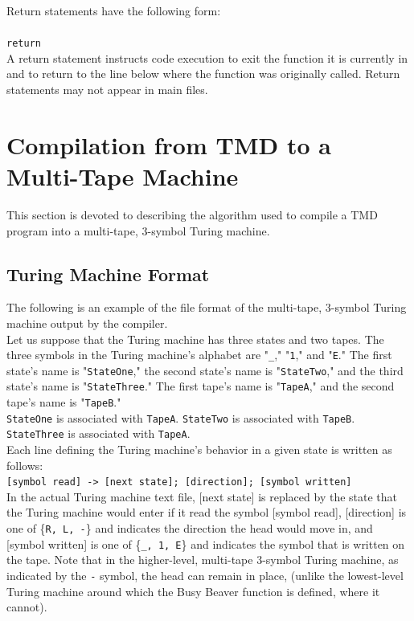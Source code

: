 \documentclass[11pt]{report}
\begin{document}
Return statements have the following form: \\ \\
\texttt{return} \\

A return statement instructs code execution to exit the function it is currently in and to return to the line below where the function was originally called. Return statements may not appear in main files.

\section{Compilation from TMD to a Multi-Tape Machine} \label{sec:turdtotm}

This section is devoted to describing the algorithm used to compile a TMD program into a multi-tape, 3-symbol Turing machine.

\subsection{Turing Machine Format}

The following is an example of the file format of the multi-tape, 3-symbol Turing machine output by the compiler. \\

Let us suppose that the Turing machine has three states and two tapes. The three symbols in the Turing machine's alphabet are "\texttt{\_}," "\texttt{1}," and "\texttt{E}." The first state's name is "\texttt{StateOne}," the second state's name is "\texttt{StateTwo}," and the third state's name is "\texttt{StateThree}." The first tape's name is "\texttt{TapeA}," and the second tape's name is "\texttt{TapeB}." \\

\texttt{StateOne} is associated with \texttt{TapeA}. \texttt{StateTwo} is associated with \texttt{TapeB}. \texttt{StateThree} is associated with \texttt{TapeA}. \\

Each line defining the Turing machine's behavior in a given state is written as follows: \\

\texttt{[symbol read] -> [next state]; [direction]; [symbol written]} \\

In the actual Turing machine text file, [next state] is replaced by the state that the Turing machine would enter if it read the symbol [symbol read], [direction] is one of \{\texttt{R, L, -}\} and indicates the direction the head would move in, and [symbol written] is one of \{\texttt{\_, 1, E}\} and indicates the symbol that is written on the tape. Note that in the higher-level, multi-tape 3-symbol Turing machine, as indicated by the \texttt{-} symbol, the head can remain in place, (unlike the lowest-level Turing machine around which the Busy Beaver function is defined, where it cannot). \\
\end{document}
